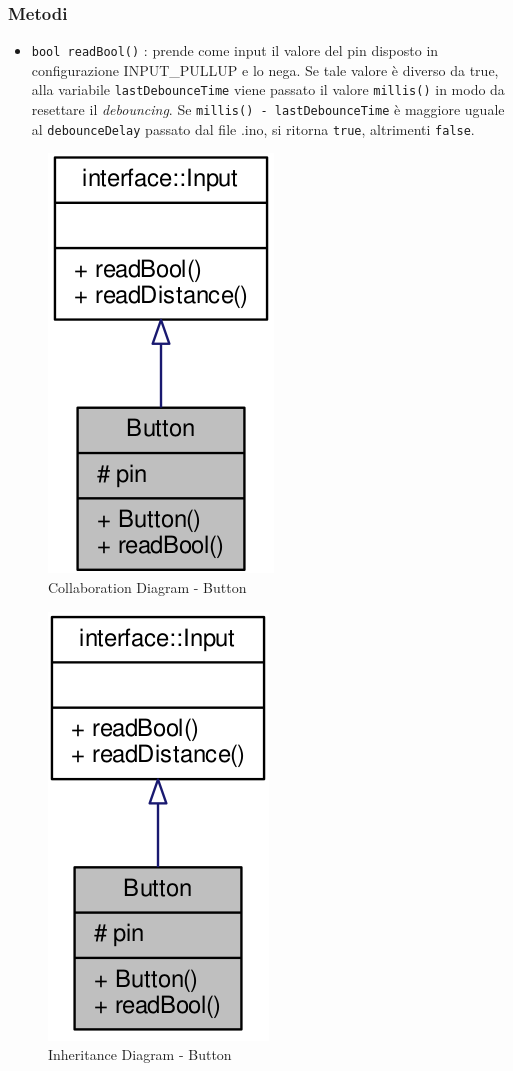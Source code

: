 \subsubsection{Metodi}
\begin{itemize}
	\item \texttt{bool readBool()} : prende come input il valore del pin disposto in configurazione INPUT\_PULLUP e lo nega. Se tale valore è diverso da true, alla variabile \texttt{lastDebounceTime} viene passato il valore \texttt{millis()} in modo da resettare il \textit{debouncing}.
	Se \texttt{millis() - lastDebounceTime} è maggiore uguale al \texttt{debounceDelay} passato dal file .ino, si ritorna \texttt{true}, altrimenti \texttt{false}.
\end{itemize}
\begin{figure}[!ht]
	\centering
	\includegraphics[scale=.35]{img/UML/CollaborationDiagram/Button.png}
	\caption{Collaboration Diagram - Button}
\end{figure}
\begin{figure}[!ht]
	\centering
	\includegraphics[scale=.35]{img/UML/InheritanceDiagram/Button.png}
	\caption{Inheritance Diagram - Button}
\end{figure}


